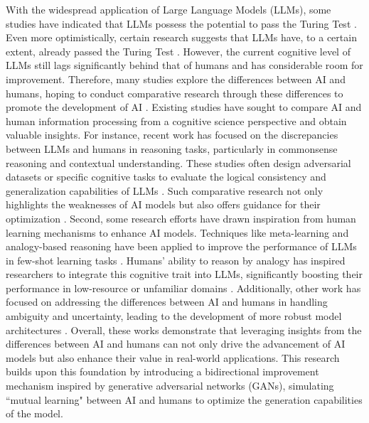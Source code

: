 With the widespread application of Large Language Models (LLMs), some studies have indicated that LLMs possess the potential to pass the Turing Test \citep{sejnowski2023large}. Even more optimistically, certain research suggests that LLMs have, to a certain extent, already passed the Turing Test \citep{sejnowski2023large}. However, the current cognitive level of LLMs still lags significantly behind that of humans and has considerable room for improvement. Therefore, many studies explore the differences between AI and humans, hoping to conduct comparative research through these differences to promote the development of AI \citep{djeffal2022role}. Existing studies have sought to compare AI and human information processing from a cognitive science perspective and obtain valuable insights. For instance, recent work has focused on the discrepancies between LLMs and humans in reasoning tasks, particularly in commonsense reasoning and contextual understanding. These studies often design adversarial datasets or specific cognitive tasks to evaluate the logical consistency and generalization capabilities of LLMs \citep{ying2023intuitive, gu2024survey}. Such comparative research not only highlights the weaknesses of AI models but also offers guidance for their optimization \citep{surianarayanan2023survey}. Second, some research efforts have drawn inspiration from human learning mechanisms to enhance AI models. Techniques like meta-learning and analogy-based reasoning have been applied to improve the performance of LLMs in few-shot learning tasks \citep{yuan2023analogykb}. Humans' ability to reason by analogy has inspired researchers to integrate this cognitive trait into LLMs, significantly boosting their performance in low-resource or unfamiliar domains \citep{guo2024teaching}. Additionally, other work has focused on addressing the differences between AI and humans in handling ambiguity and uncertainty, leading to the development of more robust model architectures \citep{chander2024toward}. Overall, these works demonstrate that leveraging insights from the differences between AI and humans can not only drive the advancement of AI models but also enhance their value in real-world applications. This research builds upon this foundation by introducing a bidirectional improvement mechanism inspired by generative adversarial networks (GANs), simulating ``mutual learning" between AI and humans to optimize the generation capabilities of the model.